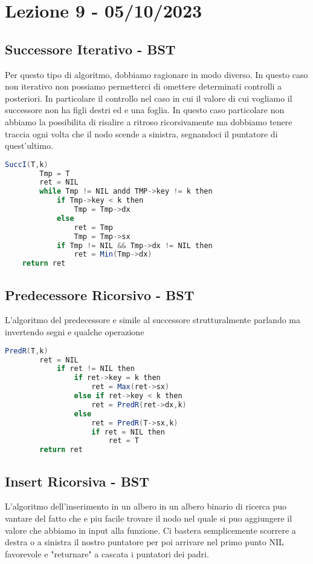 \section{Lezione 9 - 05/10/2023}

\subsection{Successore Iterativo - BST}

Per questo tipo di algoritmo, dobbiamo ragionare in modo diverso. In questo caso non iterativo non possiamo permetterci di omettere determinati controlli a posteriori. In particolare il controllo nel caso in cui il valore di cui vogliamo il successore non ha figli destri ed e una foglia. In questo caso particolare non abbiamo la possibilita di risalire a ritroso ricorsivamente ma dobbiamo tenere traccia ogni volta che il nodo scende a sinistra, segnandoci il puntatore di quest'ultimo.

\begin{lstlisting}[language=Java]
	SuccI(T,k)
		Tmp = T
		ret = NIL
		while Tmp != NIL andd TMP->key != k then
			if Tmp->key < k then
				Tmp = Tmp->dx
			else 
				ret = Tmp
				Tmp = Tmp->sx
			if Tmp != NIL && Tmp->dx != NIL then
				ret = Min(Tmp->dx)
	return ret
\end{lstlisting}


\subsection{Predecessore Ricorsivo - BST}
L'algoritmo del predecessore e simile al successore strutturalmente parlando ma invertendo segni e qualche operazione

\begin{lstlisting}[language=Java]
	PredR(T,k)
		ret = NIL
			if ret != NIL then
				if ret->key = k then
					ret = Max(ret->sx)
				else if ret->key < k then
					ret = PredR(ret->dx,k)
				else 
					ret = PredR(T->sx,k)
					if ret = NIL then
						ret = T
		return ret
\end{lstlisting}

\subsection{Insert Ricorsiva - BST}

L'algoritmo dell'inserimento in un albero in un albero binario di ricerca puo vantare del fatto che e piu facile trovare il nodo nel quale si puo aggiungere il valore che abbiamo in input alla funzione. Ci bastera semplicemente scorrere a destra o a sinistra il nostro puntatore per poi arrivare nel primo punto NIL favorevole e "returnare" a cascata i puntatori dei padri.

